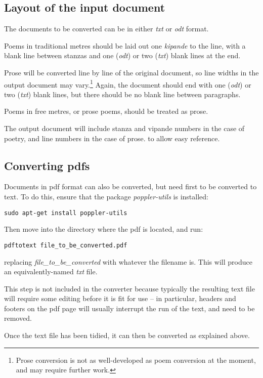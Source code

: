 \subsection{Layout of the input document}
\label{s:layout}

The documents to be converted can be in either \textit{txt} or \textit{odt} format.

Poems in traditional metres should be laid out one \textit{kipande} to the line, with a blank line between stanzas and one (\textit{odt}) or two (\textit{txt}) blank lines at the end.

Prose will be converted line by line of the original document, so line widths in the output document may vary.\footnote{Prose conversion is not as well-developed as poem conversion at the moment, and may require further work.}  Again, the document should end with one (\textit{odt}) or two (\textit{txt}) blank lines, but there should be no blank line between paragraphs.

Poems in free metres, or prose poems, should be treated as prose.

The output document will include stanza and vipande numbers in the case of poetry, and line numbers in the case of prose. to allow easy reference.

\subsection{Converting pdfs}

Documents in pdf format can also be converted, but need first to be converted to text.  To do this, ensure that the package \textit{poppler-utils} is installed:

\verb|sudo apt-get install poppler-utils|

Then move into the directory where the pdf is located, and run:

\verb|pdftotext file_to_be_converted.pdf|

replacing \textit{file\_to\_be\_converted} with whatever the filename is.  This will produce an equivalently-named \textit{txt} file.

This step is not included in the converter because typically the resulting text file will require some editing before it is fit for use -- in particular, headers and footers on the pdf page will usually interrupt the run of the text, and need to be removed.

Once the text file has been tidied, it can then be converted as explained above.


